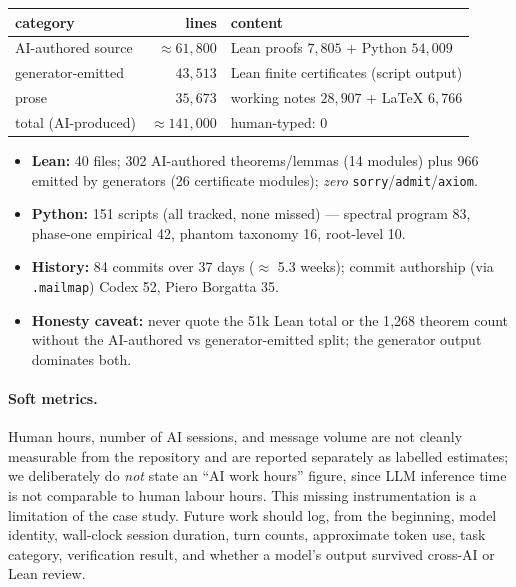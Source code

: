 \documentclass[11pt,a4paper]{article}
\theoremstyle{definition}
\begin{document}
\begin{center}
\begin{tabular}{lrl}
\toprule
category & lines & content \\
\midrule
AI-authored source & $\approx 61{,}800$ & Lean proofs $7{,}805$ + Python $54{,}009$ \\
generator-emitted & $43{,}513$ & Lean finite certificates (script output) \\
prose & $35{,}673$ & working notes $28{,}907$ + LaTeX $6{,}766$ \\
\midrule
total (AI-produced) & $\approx 141{,}000$ & human-typed: $0$ \\
\bottomrule
\end{tabular}
\end{center}

\begin{itemize}[leftmargin=2em]
  \item \textbf{Lean:} 40 files; 302 AI-authored theorems/lemmas (14 modules)
        plus 966 emitted by generators (26 certificate modules); \emph{zero}
        \texttt{sorry}/\texttt{admit}/\texttt{axiom}.
  \item \textbf{Python:} 151 scripts (all tracked, none missed) ---
        spectral program 83, phase-one empirical 42, phantom taxonomy 16,
        root-level 10.
  \item \textbf{History:} 84 commits over 37 days ($\approx$ 5.3 weeks);
        commit authorship (via \texttt{.mailmap}) Codex 52, Piero Borgatta 35.
  \item \textbf{Honesty caveat:} never quote the 51k Lean total or the 1{,}268
        theorem count without the AI-authored vs generator-emitted split; the
        generator output dominates both.
\end{itemize}

\paragraph{Soft metrics.} Human hours, number of AI sessions, and message
volume are not cleanly measurable from the repository and are reported
separately as labelled estimates; we deliberately do \emph{not} state an
``AI work hours'' figure, since LLM inference time is not comparable to human
labour hours. This missing instrumentation is a limitation of the case
study. Future work should log, from the beginning, model identity, wall-clock
session duration, turn counts, approximate token use, task category,
verification result, and whether a model's output survived cross-AI or Lean
review.
\end{document}

